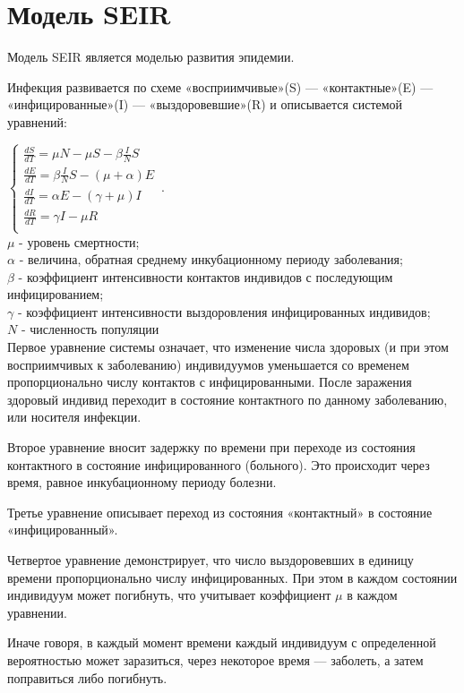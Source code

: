 \documentclass[5pt]{article}
\begin{document}
\section{Модель SEIR}
Модель SEIR является моделью развития эпидемии.

Инфекция развивается по схеме «восприимчивые»(S) — «контактные»(E) — «инфицированные»(I) — «выздоровевшие»(R) и описывается системой уравнений:

$
\begin{cases}
      \frac{dS}{dT} = \mu N  - \mu S - \beta \frac{I}{N} S\\
      \frac{dE}{dT} = \beta \frac{I}{N} S - ( \mu + \alpha ) E\\
      \frac{dI}{dT} = \alpha E - (\gamma + \mu) I \\
      \frac{dR}{dT} = \gamma I - \mu R\\
    \end{cases}\,.
$\\
$\mu$ - уровень смертности;\\
$\alpha$ - величина, обратная среднему инкубационному периоду заболевания;\\
$\beta$ - коэффициент интенсивности контактов индивидов с последующим инфицированием;\\
$\gamma$ - коэффициент интенсивности выздоровления инфицированных индивидов;\\
$N$ - численность популяции\\

Первое уравнение системы означает, что изменение числа здоровых (и при этом восприимчивых к заболеванию) индивидуумов уменьшается со временем пропорционально числу контактов с инфицированными. После заражения здоровый индивид переходит в состояние контактного по данному заболеванию, или носителя инфекции.

Второе уравнение вносит задержку по времени при переходе из состояния контактного в состояние инфицированного (больного). Это происходит через время, равное инкубационному периоду болезни.

Третье уравнение описывает переход из состояния «контактный» в состояние «инфицированный».

Четвертое уравнение демонстрирует, что число выздоровевших в единицу времени пропорционально числу инфицированных. При этом в каждом состоянии индивидуум может погибнуть, что учитывает коэффициент $\mu$ в каждом уравнении.

Иначе говоря, в каждый момент времени каждый индивидуум с определенной вероятностью может заразиться, через некоторое время — заболеть, а затем поправиться либо погибнуть.
\end{document}
